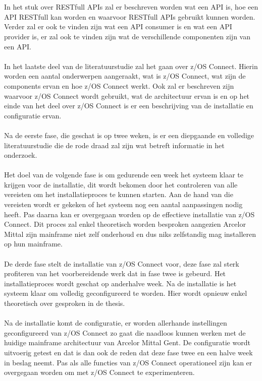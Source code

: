 \\ \\
In het stuk over RESTfull APIs zal er beschreven worden wat een API is, hoe een API RESTfull kan worden en waarvoor RESTfull APIs gebruikt kunnen worden. Verder zal er ook te vinden zijn wat een API consumer is en wat een API provider is, er zal ook te vinden zijn wat de verschillende componenten zijn van een API.
\\ \\
In het laatste deel van de literatuurstudie zal het gaan over z/OS Connect. Hierin worden een aantal onderwerpen aangeraakt, wat is z/OS Connect, wat zijn de components ervan en hoe z/OS Connect werkt. Ook zal er beschreven zijn waarvoor z/OS Connect wordt gebruikt, wat de architectuur ervan is en op het einde van het deel over z/OS Connect is er een beschrijving van de installatie en configuratie ervan.
\\ \\
Na de eerste fase, die geschat is op twee weken, is er een diepgaande en volledige literatuurstudie die de rode draad zal zijn wat betreft informatie in het onderzoek.
\\ \\
Het doel van de volgende fase is om gedurende een week het systeem klaar te krijgen voor de installatie, dit wordt bekomen door het controleren van alle vereisten om het installatieproces te kunnen starten. Aan de hand van die vereisten wordt er gekeken of het systeem nog een aantal aanpassingen nodig heeft. Pas daarna kan er overgegaan worden op de effectieve installatie van z/OS Connect. Dit proces zal enkel theoretisch worden besproken aangezien Arcelor Mittal zijn mainframe niet zelf onderhoud en dus niks zelfstandig mag installeren op hun mainframe.
\\ \\
De derde fase stelt de installatie van z/OS Connect voor, deze fase zal sterk profiteren van het voorbereidende werk dat in fase twee is gebeurd. Het installatieproces wordt geschat op anderhalve week. Na de installatie is het systeem klaar om volledig geconfigureerd te worden. Hier wordt opnieuw enkel theoretisch over gesproken in de thesis.
\\ \\
Na de installatie komt de configuratie, er worden allerhande instellingen geconfigureerd van z/OS Connect zo gaat die naadloos kunnen werken met de huidige mainframe architectuur van Arcelor Mittal Gent. De configuratie wordt uitvoerig getest en dat is dan ook de reden dat deze fase twee en een halve week in beslag neemt. Pas als alle functies van z/OS Connect operationeel zijn kan er overgegaan worden om met z/OS Connect te experimenteren.
